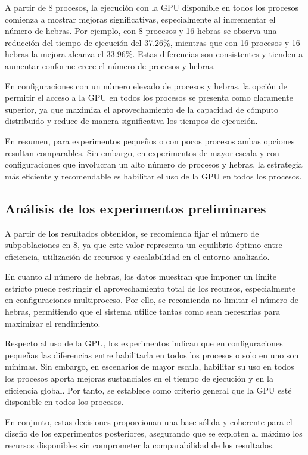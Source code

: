 A partir de 8 procesos, la ejecución con la GPU disponible en todos los procesos comienza a mostrar mejoras significativas, especialmente al incrementar el número de hebras. Por ejemplo, con 8 procesos y 16 hebras se observa una reducción del tiempo de ejecución del 37.26\%, mientras que con 16 procesos y 16 hebras la mejora alcanza el 33.96\%. Estas diferencias son consistentes y tienden a aumentar conforme crece el número de procesos y hebras.

En configuraciones con un número elevado de procesos y hebras, la opción de permitir el acceso a la GPU en todos los procesos se presenta como claramente superior, ya que maximiza el aprovechamiento de la capacidad de cómputo distribuido y reduce de manera significativa los tiempos de ejecución.

En resumen, para experimentos pequeños o con pocos procesos ambas opciones resultan comparables. Sin embargo, en experimentos de mayor escala y con configuraciones que involucran un alto número de procesos y hebras, la estrategia más eficiente y recomendable es habilitar el uso de la GPU en todos los procesos.

\subsection{Análisis de los experimentos preliminares}

A partir de los resultados obtenidos, se recomienda fijar el número de subpoblaciones en 8, ya que este valor representa un equilibrio óptimo entre eficiencia, utilización de recursos y escalabilidad en el entorno analizado.

En cuanto al número de hebras, los datos muestran que imponer un límite estricto puede restringir el aprovechamiento total de los recursos, especialmente en configuraciones multiproceso. Por ello, se recomienda no limitar el número de hebras, permitiendo que el sistema utilice tantas como sean necesarias para maximizar el rendimiento.

Respecto al uso de la GPU, los experimentos indican que en configuraciones pequeñas las diferencias entre habilitarla en todos los procesos o solo en uno son mínimas. Sin embargo, en escenarios de mayor escala, habilitar su uso en todos los procesos aporta mejoras sustanciales en el tiempo de ejecución y en la eficiencia global. Por tanto, se establece como criterio general que la GPU esté disponible en todos los procesos.

En conjunto, estas decisiones proporcionan una base sólida y coherente para el diseño de los experimentos posteriores, asegurando que se exploten al máximo los recursos disponibles sin comprometer la comparabilidad de los resultados.

